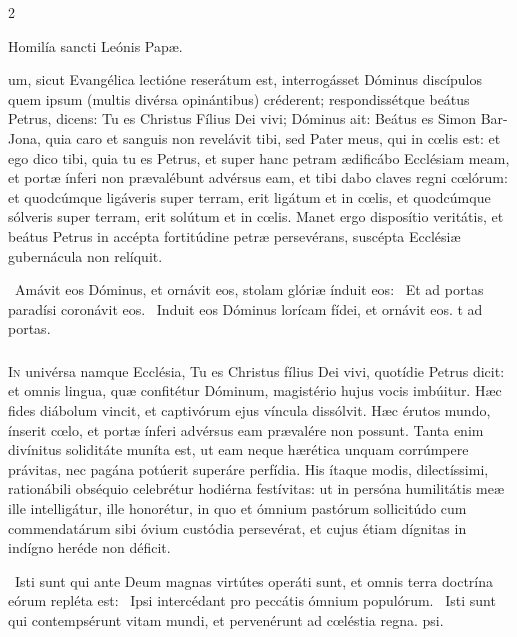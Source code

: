 \documentclass[9pt,twoside]{extarticle}
\begin{document}
\begin{multicols}{2}
\begin{center}Homilía sancti Leónis Papæ.\\
\end{center}
um, sicut Evangélica lectióne reserátum est, interrogásset Dóminus discípulos quem ipsum (multis divérsa opinántibus) créderent; respondissétque beátus Petrus, dicens: Tu es Christus Fílius Dei vivi; Dóminus ait: Beátus es Simon Bar-Jona, quia caro et sanguis non revelávit tibi, sed Pater meus, qui in cœlis est: et ego dico tibi, quia tu es Petrus, et super hanc petram ædificábo Ecclésiam meam, et portæ ínferi non prævalébunt advérsus eam, et tibi dabo claves regni cœlórum: et quodcúmque ligáveris super terram, erit ligátum et in cœlis, et quodcúmque sólveris super terram, erit solútum et in cœlis. Manet ergo disposítio veritátis, et beátus Petrus in accépta fortitúdine petræ persevérans, suscépta Ecclésiæ gubernácula non relíquit.

\begin{tightlist}{}
\item {}~Amávit eos Dóminus, et ornávit eos, stolam glóriæ índuit eos: \textred{*}~Et ad portas paradísi coronávit eos. ~Induit eos Dóminus lorícam fídei, et ornávit eos. t ad portas.
\end{tightlist}

\subsubsection*{\center {}}
\lettrine{I}n univérsa namque Ecclésia, Tu es Christus fílius Dei vivi, quotídie Petrus dicit: et omnis lingua, quæ confitétur Dóminum, magistério hujus vocis imbúitur. Hæc fides diábolum vincit, et captivórum ejus víncula dissólvit. Hæc érutos mundo, ínserit cœlo, et portæ ínferi advérsus eam prævalére non possunt. Tanta enim divínitus soliditáte muníta est, ut eam neque hærética unquam corrúmpere právitas, nec pagána potúerit superáre perfídia. His ítaque modis, dilectíssimi, rationábili obséquio celebrétur hodiérna festívitas: ut in persóna humilitátis meæ ille intelligátur, ille honorétur, in quo et ómnium pastórum sollicitúdo cum commendatárum sibi óvium custódia persevérat, et cujus étiam dígnitas in indígno heréde non déficit.

\begin{tightlist}{}
\item {}~Isti sunt qui ante Deum magnas virtútes operáti sunt, et omnis terra doctrína eórum repléta est: \textred{*}~Ipsi intercédant pro peccátis ómnium populórum. ~Isti sunt qui contempsérunt vitam mundi, et pervenérunt ad cœléstia regna. psi.
\item {}
\end{tightlist}


\end{multicols}
\end{document}
